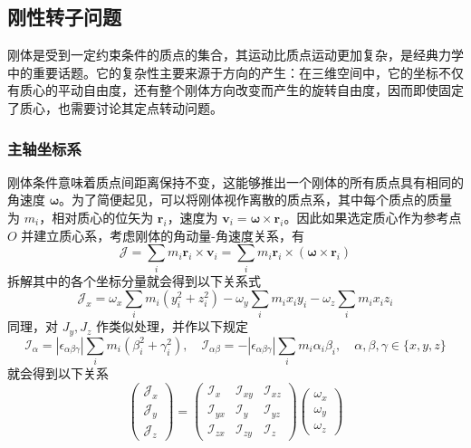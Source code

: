 \documentclass[cn,10pt,math=newtx,citestyle=gb7714-2015,bibstyle=gb7714-2015]{elegantbook}
\def\bm{\boldsymbol}
\def\mc{\mathcal}
\begin{document}
\subsection{刚性转子问题}
刚体是受到一定约束条件的质点的集合，其运动比质点运动更加复杂，是经典力学中的重要话题。它的复杂性主要来源于方向的产生：在三维空间中，它的坐标不仅有质心的平动自由度，还有整个刚体方向改变而产生的旋转自由度，因而即使固定了质心，也需要讨论其定点转动问题。

\subsubsection{主轴坐标系}
刚体条件意味着质点间距离保持不变，这能够推出一个刚体的所有质点具有相同的角速度 $\bm \omega$。为了简便起见，可以将刚体视作离散的质点系，其中每个质点的质量为 $m_i$，相对质心的位矢为 $\bm r_i$，速度为 $\bm v_i=\bm\omega\times\bm r_i$。因此如果选定质心作为参考点 $O$ 并建立质心系，考虑刚体的角动量-角速度关系，有
\begin{equation}
    \bm{\mc J} = \sum_i m_i\bm r_i\times \bm v_i = \sum_i m_i\bm r_i\times(\bm\omega\times \bm r_i)
\end{equation}
拆解其中的各个坐标分量就会得到以下关系式
\begin{equation}
    \mc J_x = \omega_x\sum_i m_i(y_i^2+z_i^2)-\omega_y\sum_i m_i x_iy_i-\omega_z\sum_i m_ix_iz_i
\end{equation}
同理，对 $J_y,J_z$ 作类似处理，并作以下规定
\begin{equation}
    \mc I_{\alpha} = |\epsilon_{\alpha\beta\gamma}|\sum_i m_i(\beta_i^2+\gamma_i^2),\quad \mc I_{\alpha\beta} = -|\epsilon_{\alpha\beta\gamma}|\sum_i m_i\alpha_i\beta_i,\quad\alpha,\beta,\gamma\in\{x,y,z\}
\end{equation}
就会得到以下关系
\begin{equation}
    \begin{pmatrix}
    \mc J_x\\\mc J_y\\\mc J_z
    \end{pmatrix}=\begin{pmatrix}
    \mc I_x & \mc I_{xy} & \mc I_{xz}\\ \mc I_{yx} & \mc I_y & \mc I_{yz}\\ \mc I_{zx} & \mc I_{zy} & \mc I_z
    \end{pmatrix}\begin{pmatrix}
    \omega_x\\\omega_y\\\omega_z
    \end{pmatrix}
\end{equation}
\end{document}
